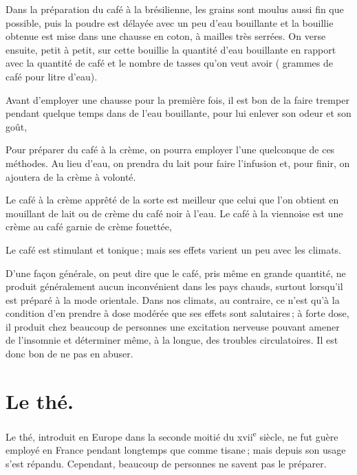 \sk


Dans la préparation du café à la brésilienne, les grains sont moulus aussi fin
que possible, puis la poudre est délayée avec un peu d'eau bouillante et la
bouillie obtenue est mise dans une chausse en coton, à mailles très serrées. On
verse ensuite, petit à petit, sur cette bouillie la quantité d'eau bouillante
en rapport avec la quantité de café et le nombre de tasses qu'on veut avoir
({\mmm} grammes de café pour {\mmm} litre d'eau).

Avant d'employer une chausse pour la première fois, il est bon de la faire
tremper pendant quelque temps dans de l’eau bouillante, pour lui enlever son
odeur et son goût,

\sk

Pour préparer du café à la crème, on pourra employer l’une quelconque de ces
méthodes. Au lieu d'eau, on prendra du lait pour faire l'infusion et, pour
finir, on ajoutera de la crème à volonté.

Le café à la crème apprêté de la sorte est meilleur que celui que l'on obtient
en mouillant de lait ou de crème du café noir à l'eau.
Le café à la viennoise est une crème au café garnie de crème fouettée,

\sk

Le café est stimulant et tonique ; mais ses effets varient un peu avec les
climats.

D'une façon générale, on peut dire que le café, pris même en grande quantité,
ne produit généralement aucun inconvénient dans les pays chauds, surtout
lorsqu'il est préparé à la mode orientale. Dans nos climats, au contraire, ce
n'est qu'à la condition d'en prendre à dose modérée que ses effets sont
salutaires ; à forte dose, il produit chez beaucoup de personnes une excitation
nerveuse pouvant amener de l'insomnie et déterminer même, à la longue, des
troubles circulatoires. Il est donc bon de ne pas en abuser.

\section*{\centering Le thé.}
{}

Le thé, introduit en Europe dans la seconde moitié du xvii\textsuperscript{e}
siècle, ne fut guère employé en France pendant longtemps que comme tisane ;
mais depuis {\mmm} son usage s’est répandu. Cependant, beaucoup de
personnes ne savent pas le préparer.

